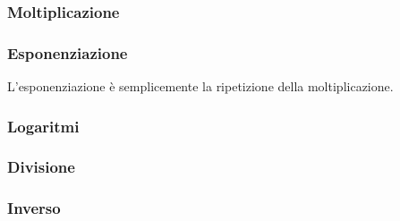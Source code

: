 \textsf{\small }

\subsubsection{Moltiplicazione}



\subsubsection{Esponenziazione} %

\textsf{\small L'esponenziazione è semplicemente la ripetizione della moltiplicazione.}




\subsubsection{Logaritmi}



\subsubsection{Divisione}

\textsf{\small }

\subsubsection{Inverso}

